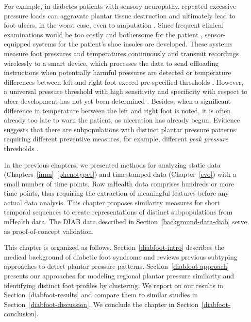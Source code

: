 \documentclass[
  oneside]{book}
\begin{document}
For example, in diabetes patients with sensory neuropathy, repeated excessive pressure loads can aggravate plantar tissue destruction and ultimately lead to foot ulcers, in the worst case, even to amputation \autocite{RN7}.
Since frequent clinical examinations would be too costly and bothersome for the patient \autocite{ming2019study}, sensor-equipped systems for the patient's shoe insoles are developed.
These systems measure foot pressures and temperatures continuously and transmit recordings wirelessly to a smart device, which processes the data to send offloading instructions when potentially harmful pressures are detected \autocite{abbott2019} or temperature differences between left and right foot exceed pre-specified thresholds \autocite{ming2019study}.
However, a universal pressure threshold with high sensitivity and specificity with respect to ulcer development has not yet been determined \autocite{Waldecker:FootAnkleSurgery2012,fernando2018importance}.
Besides, when a significant difference in temperature between the left and right foot is noted, it is often already too late to warn the patient, as ulceration has already begun.
Evidence suggests that there are subpopulations with distinct plantar pressure patterns requiring different preventive measures, for example, different \emph{peak pressure} thresholds \autocite{GiacomozziMartelli:PeakPressure2006,DeCockEtAl:FootTypeClusteringPlantarPressure2006,BennettsEtAl:Biomechanics2013,DeschampsEtAL:KMeansDiabeticFoot2013}.

In the previous chapters, we presented methods for analyzing static data (Chapters~\ref{imm}--\ref{phenotypes}) and timestamped data (Chapter~\ref{evo}) with a small number of time points.
Raw mHealth data comprises hundreds or more time points, thus requiring the extraction of meaningful features before any actual data analysis.
This chapter proposes similarity measures for short temporal sequences to create representations of distinct subpopulations from mHealth data.
The DIAB data described in Section~\ref{background-data-diab} serve as proof-of-concept validation.

This chapter is organized as follows.
Section~\ref{diabfoot-intro} describes the medical background of diabetic foot syndrome and reviews previous subtyping approaches to detect plantar pressure patterns.
Section~\ref{diabfoot-approach} presents our approaches for modeling regional plantar pressure similarity and identifying distinct foot profiles by clustering.
We report on our results in Section~\ref{diabfoot-results} and compare them to similar studies in Section~\ref{diabfoot-discussion}.
We conclude the chapter in Section~\ref{diabfoot-conclusion}.
\end{document}
